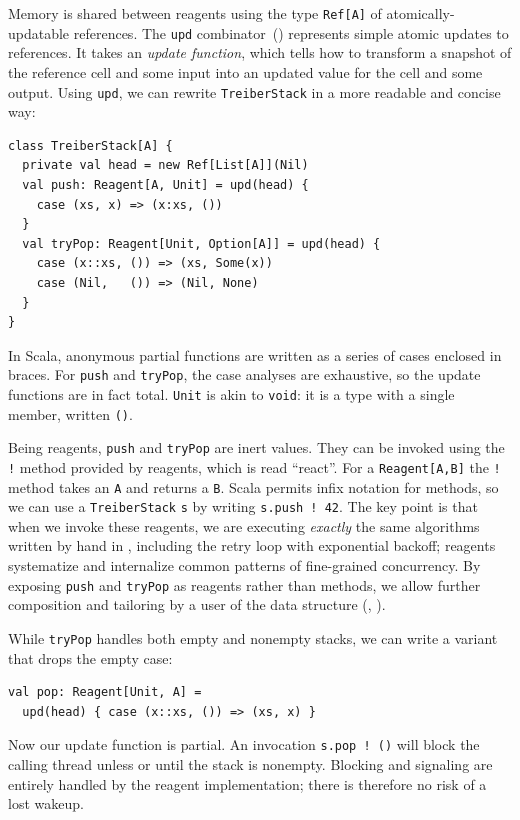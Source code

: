 \documentclass[preprint,nocopyrightspace]{sigplanconf}
\begin{document}
Memory is shared between reagents using the type \lstinline{Ref[A]} of
atomically-updatable references.
The \lstinline{upd} combinator~() represents simple atomic
updates to references.  It takes an \emph{update function}, which tells how to
transform a snapshot of the reference cell and some input into an updated
value for the cell and some output.  Using \lstinline{upd}, we can rewrite
\lstinline{TreiberStack} in a more readable and concise way:
\begin{lstlisting}
class TreiberStack[A] {
  private val head = new Ref[List[A]](Nil)
  val push: Reagent[A, Unit] = upd(head) {
    case (xs, x) => (x:xs, ())
  }
  val tryPop: Reagent[Unit, Option[A]] = upd(head) {
    case (x::xs, ()) => (xs, Some(x))
    case (Nil,   ()) => (Nil, None)
  }
}
\end{lstlisting}
In Scala, anonymous partial functions are written as a series of cases
enclosed in braces.  For \lstinline{push} and \lstinline{tryPop}, the case
analyses are exhaustive, so the update functions are in fact total.
\lstinline{Unit} is akin to \lstinline{void}: it is a type with a single
member, written \lstinline{()}.

Being reagents, \lstinline{push} and \lstinline{tryPop} are inert values.  They
can be invoked using the \lstinline{!} method provided by reagents, which is
read ``react''.  For a \lstinline{Reagent[A,B]} the \lstinline{!} method takes
an \lstinline{A} and returns a \lstinline{B}.  Scala permits infix notation for
methods, so we can use a \lstinline{TreiberStack} \lstinline{s} by writing
\lstinline{s.push ! 42}.  The key point is that when we invoke these reagents,
we are executing \emph{exactly} the same algorithms written by hand in
, including the retry loop with exponential backoff; reagents
systematize and internalize common patterns of fine-grained concurrency.  By
exposing \lstinline{push} and \lstinline{tryPop} as reagents rather than
methods, we allow further composition and tailoring by a user of the data
structure (, ).

While \lstinline{tryPop} handles both empty and nonempty stacks, we
can write a variant that drops the empty case:
\begin{lstlisting}
val pop: Reagent[Unit, A] = 
  upd(head) { case (x::xs, ()) => (xs, x) }
\end{lstlisting}
Now our update function is partial.  An invocation \lstinline{s.pop ! ()} will
block the calling thread unless or until the stack is nonempty.  Blocking and
signaling are entirely handled by the reagent implementation; there is
therefore no risk of a lost wakeup.  %
\end{document}
